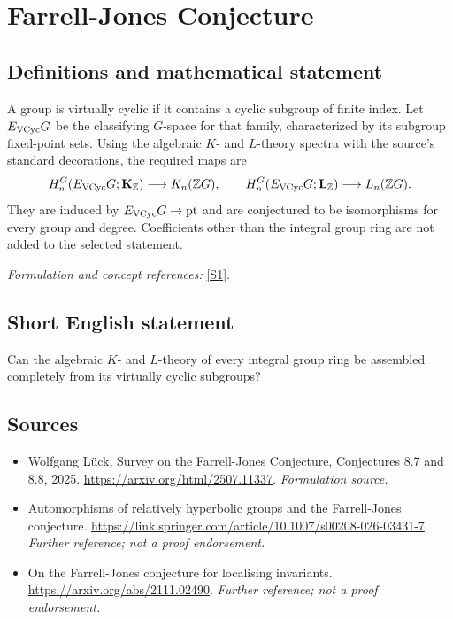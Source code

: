 \documentclass[11pt]{article}
\begin{document}
\section*{\texorpdfstring{Farrell-Jones Conjecture}{Farrell-Jones Conjecture}}\label{statement}
\subsection{Definitions and mathematical statement}
A group is virtually cyclic if it contains a cyclic subgroup of finite index. Let $E_{\rm VCyc}G$ be the classifying $G$-space for that family, characterized by its subgroup fixed-point sets. Using the algebraic $K$- and $L$-theory spectra with the source's standard decorations, the required maps are
\[
 H_n^G(E_{\rm VCyc}G;\mathbf K_{{\mathbb{Z}}})\longrightarrow K_n({\mathbb{Z}} G),\qquad
 H_n^G(E_{\rm VCyc}G;\mathbf L_{{\mathbb{Z}}})\longrightarrow L_n({\mathbb{Z}} G).
\]
They are induced by $E_{\rm VCyc}G\to\mathrm{pt}$ and are conjectured to be isomorphisms for every group and degree. Coefficients other than the integral group ring are not added to the selected statement.
\par\smallskip\textit{Formulation and concept references:} \href{https://arxiv.org/html/2507.11337}{[S1]}.

\subsection{Short English statement}
Can the algebraic $K$- and $L$-theory of every integral group ring be assembled completely from its virtually cyclic subgroups?
\subsection{Sources}
\begin{itemize}
\item[S1]Wolfgang Lück, Survey on the Farrell-Jones Conjecture, Conjectures 8.7 and 8.8, 2025.
\url{https://arxiv.org/html/2507.11337}.
\textit{Formulation source.}
\item[S2]Automorphisms of relatively hyperbolic groups and the Farrell-Jones conjecture.
\url{https://link.springer.com/article/10.1007/s00208-026-03431-7}.
\textit{Further reference; not a proof endorsement.}
\item[S3]On the Farrell-Jones conjecture for localising invariants.
\url{https://arxiv.org/abs/2111.02490}.
\textit{Further reference; not a proof endorsement.}
\end{itemize}
\end{document}
